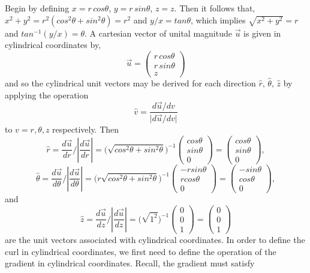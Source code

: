 \documentclass[12pt]{article}
\theoremstyle{definition}
\numberwithin{equation}{section}
\begin{document}
{Begin by defining $x=r\, cos\theta$, $y=r\, sin\theta$, $z=z$. Then it follows that, $x^{2}+y^{2}=r^{2}(cos^{2}\theta + sin^{2}\theta)=r^{2}$ and $y/x=tan\theta$, which implies $\sqrt{x^{2}+y^{2}} =r$ and $tan^{-1}(y/x)=\theta$. A cartesian vector of unital magnitude $\vec{u}$ is given in cylindrical coordinates by,
\begin{equation}
\vec{u}= \left(\begin{array}{c}r\, cos\theta\\ r\, sin\theta\\ z \end{array}\right)
\end{equation}
and so the cylindrical unit vectors may be derived for each direction $\hat{r}$, $\hat{\theta}$, $\hat{z}$ by applying the operation $$\hat{v}=\frac{d\vec{u}/dv}{\vert d\vec{u}/dv\vert}$$ to $v=r,\theta ,z$ respectively. Then
$$\hat{r}=\frac{d\vec{u}}{dr}\bigg/ \left|{\frac{d\vec{u}}{dr}}\right|=\big(\sqrt{cos^{2}\theta+sin^{2}\theta}\big)^{-1}\left(\begin{array}{c}cos\theta\\sin\theta\\0\end{array}\right)=\left(\begin{array}{c}cos\theta\\sin\theta\\0\end{array}\right),$$
$$\hat{\theta}=\frac{d\vec{u}}{d\theta}\bigg/\left|\frac{d\vec{u}}{d\theta}\right|=\big(r\sqrt{cos^{2}\theta+sin^{2}\theta}\big)^{-1}\left(\begin{array}{c}-rsin\theta\\rcos\theta\\0\end{array}\right)=\left(\begin{array}{c}-sin\theta\\cos\theta\\0\end{array}\right),$$ and
$$\hat{z}=\frac{d\vec{u}}{dz}\bigg/\left|\frac{d\vec{u}}{dz}\right|=\big(\sqrt{1^{2}})^{-1}\left(\begin{array}{c}0\\0\\1\end{array}\right)=\left(\begin{array}{c}0\\0\\1\end{array}\right)$$
are the unit vectors associated with cylindrical coordinates. In order to define the curl in cylindrical coordinates, we first need to define the operation of the gradient in cylindrical coordinates. Recall, the gradient must satisfy
}
\end{document}
